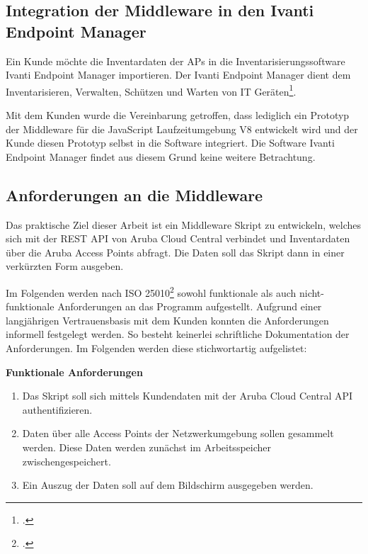 \subsection{Integration der Middleware in den Ivanti Endpoint Manager}\label{chapter:integration-der-middleware-in-den-ivanti-endpoint-manager}

Ein Kunde möchte die Inventardaten der APs in die Inventarisierungssoftware Ivanti Endpoint Manager importieren. Der Ivanti Endpoint Manager dient dem Inventarisieren, Verwalten, Schützen und Warten von IT Geräten\footcite[S. 3]{ivanti_inc_transparenz_2021}. 

Mit dem Kunden wurde die Vereinbarung getroffen, dass lediglich ein Prototyp der Middleware für die JavaScript Laufzeitumgebung V8 entwickelt wird und der Kunde diesen Prototyp selbst in die Software integriert. Die Software Ivanti Endpoint Manager findet aus diesem Grund keine weitere Betrachtung.

\subsection{Anforderungen an die Middleware}\label{subsection:anforderungen-an-die-middleware}

Das praktische Ziel dieser Arbeit ist ein Middleware Skript zu entwickeln, welches sich mit der REST API von Aruba Cloud Central verbindet und Inventardaten über die Aruba Access Points abfragt. Die Daten soll das Skript dann in einer verkürzten Form ausgeben.

Im Folgenden werden nach ISO 25010\footcite{isoiec_25010_isoiec_2011} sowohl funktionale als auch nicht-funktionale Anforderungen an das Programm aufgestellt. Aufgrund einer langjährigen Vertrauensbasis mit dem Kunden konnten die Anforderungen informell festgelegt werden. So besteht keinerlei schriftliche Dokumentation der Anforderungen. Im Folgenden werden diese stichwortartig aufgelistet:

\textbf{Funktionale Anforderungen}

\begin{enumerate}
    \item Das Skript soll sich mittels Kundendaten mit der Aruba Cloud Central API authentifizieren.
    \item Daten über alle Access Points der Netzwerkumgebung sollen gesammelt werden. Diese Daten werden zunächst im Arbeitsspeicher zwischengespeichert.
    \item Ein Auszug der Daten soll auf dem Bildschirm ausgegeben werden. 
\end{enumerate}


